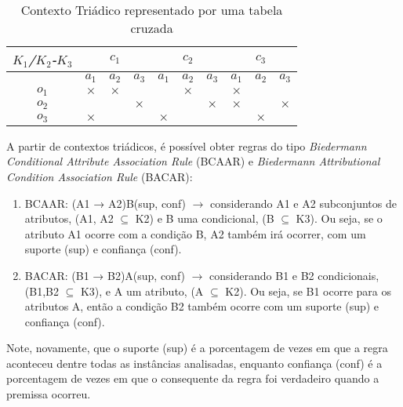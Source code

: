 \documentclass[kdmile,a4paper]{kdmile} %
\begin{document}
\begin{table}[h]
\centering
\caption{Contexto Triádico representado por uma tabela cruzada}
\label{triadictable}
\begin{tabular}{|c|c|c|c|c|c|c|c|c|c|}
\hline
\textit{\textbf{$K_{1}$/$K_{2}$-$K_{3}$}} & \multicolumn{3}{c|}{\textbf{\textit{$c_{1}$}}} & \multicolumn{3}{c|}{\textbf{\textit{$c_{2}$}}} & \multicolumn{3}{c|}{\textbf{\textit{$c_{3}$}}} \\ \hline
    & \textbf{\textit{$a_{1}$}}     & \textbf{\textit{$a_{2}$}}     & \textbf{\textit{$a_{3}$}}    & \textbf{\textit{$a_{1}$}}     & \textbf{\textit{$a_{2}$}}     & \textbf{\textit{$a_{3}$}}    & \textbf{\textit{$a_{1}$}}     & \textbf{\textit{$a_{2}$}}     & \textbf{\textit{$a_{3}$}}    \\ \hline
\textit{\textbf{$o_{1}$}}  & $\times$      & $\times$      &       &        & $\times$      &       & $\times$      &        &       \\ \hline
\textit{\textbf{$o_{2}$}}   &        &        & $\times$     &        &        & $\times$     & $\times$      &        & $\times$     \\ \hline
\textit{\textbf{$o_{3}$}}   & $\times$      &        &       & $\times$      &        &       &        & $\times$      &       \\ \hline
\end{tabular}
\end{table}


 
A partir de contextos triádicos, é possível obter regras do tipo  \textit{Biedermann Conditional Attribute Association Rule} (BCAAR)
e \textit{Biedermann Attributional Condition Association Rule} (BACAR):
\begin{enumerate}
    \item BCAAR: (A1 → A2)B(sup, conf) $\rightarrow$ considerando A1 e A2 subconjuntos de atributos, (A1, A2 $\subseteq$ K2) e B uma condicional, (B $\subseteq$ K3). Ou seja, se o atributo A1 ocorre com a condição B, A2 também irá ocorrer, com um suporte (sup) e confiança (conf).
    \item BACAR: (B1 → B2)A(sup, conf) $\rightarrow$  considerando B1 e B2 condicionais, (B1,B2 $\subseteq$ K3),  e A um atributo, (A $\subseteq$ K2). Ou seja, se B1 ocorre para os atributos A, então a condição B2 também ocorre com um suporte (sup) e confiança (conf).
\end{enumerate}

Note, novamente, que o suporte (sup) é a porcentagem de vezes em que a regra aconteceu dentre todas as instâncias analisadas, enquanto confiança (conf) é a porcentagem de vezes em que o consequente da regra foi verdadeiro quando a premissa ocorreu. 
\end{document}
